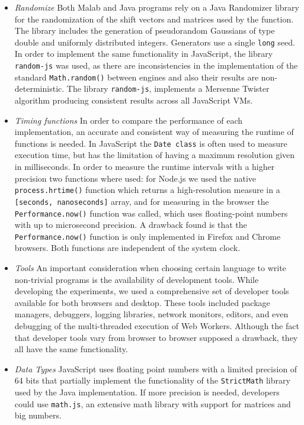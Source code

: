 \documentclass[journal,onecolumn]{IEEEtran}
\begin{document}
\begin{itemize}
\item {\em Randomize} Both Malab and Java programs rely on a 
Java Randomizer library for the 
randomization of the shift vectors and matrices used by the function.
The library includes the generation of pseudorandom Gaussians of type
double and uniformly distributed integers. Generators use a single
{\tt long} seed. In order to implement the same functionality in
JavaScript, the library {\tt random-js} was used, as there are inconsistencies 
in the implementation of the standard {\tt Math.random()} between engines
and also their results are non-deterministic. 
The library {\tt random-js}, implements a Mersenne Twister algorithm producing 
consistent results across all JavaScript VMs.
\item {\em Timing functions} In order to compare the performance of 
each implementation, an accurate and consistent way of measuring 
the runtime of functions is needed.
In JavaScript the {\tt Date class} is often used 
to measure execution time, but has the limitation of having a maximum 
resolution given in milliseconds.
In order to measure the runtime intervals with a higher precision two functions
where used: for Node.js we used the native {\tt process.hrtime()} function
which returns a high-resolution measure in a {\tt [seconds, nanoseconds]}
array, and for measuring in the browser the {\tt Performance.now()} function was called,
which uses floating-point numbers with up to microsecond precision. 
A drawback found is that the {\tt Performance.now()} function is only implemented
in Firefox and Chrome browsers. Both functions are independent of the system clock. 
\item {\em Tools} An important consideration when choosing certain language to write non-trivial programs is the availability of development tools. While developing
the experiments, we used a comprehensive set of developer tools available for both
browsers and desktop. These tools included package managers, debuggers, logging libraries, 
network monitors, editors, and even debugging of the multi-threaded execution of Web Workers.
Although the fact that developer tools vary from browser to browser supposed a drawback, they all have the same functionality.
\item {\em Data Types} JavaScript uses floating point numbers with a 
limited precision of 64 bits that partially implement the functionality of
the {\tt StrictMath} library used by the Java implementation. If more precision
is needed, developers could use {\tt math.js}, an extensive math library with
support for matrices and big numbers.
\end{itemize}
\end{document}
